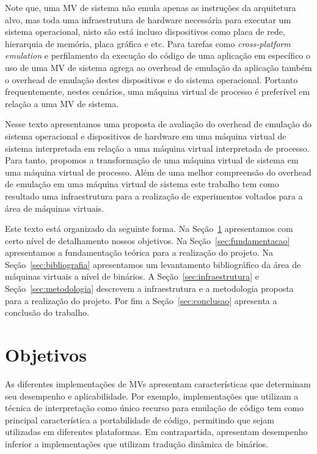 \documentclass[11pt,twoside]{article}
\begin{document}
Note que, uma MV de sistema não emula apenas as instruções da arquitetura alvo, mas toda uma infraestrutura de hardware
necessária para executar um sistema operacional, nisto são está incluso dispositivos como placa de rede, hierarquia de memória,
placa gráfica e etc. Para tarefas como \textit{cross-platform emulation} e perfilamento da execução do código de uma aplicação
em específico o uso de uma MV de sistema agrega ao overhead de emulação da aplicação também o overhead de emulação destes 
dispositivos e do sistema operacional. Portanto frequentemente, nestes cenários, uma máquina virtual de processo é preferível
em relação a uma MV de sistema.

Nesse texto apresentamos uma proposta de avaliação do overhead de emulação do sistema operacional e dispositivos de hardware
em uma máquina virtual de sistema interpretada em relação a uma máquina virtual interpretada de processo. Para tanto, propomos
a transformação de uma máquina virtual de sistema em uma máquina virtual de processo. Além de uma melhor compreensão do overhead
de emulação em uma máquina virtual de sistema este trabalho tem como resultado uma infraestrutura para a realização de experimentos
voltados para a área de máquinas virtuais. 

Este texto está organizado da seguinte forma. Na Seção~\ref{sec:objetivos} apresentamos com certo nível de detalhamento nossos objetivos. 
Na Seção~\ref{sec:fundamentacao} apresentamos a fundamentação teórica para a realização do projeto. Na Seção~\ref{sec:bibliografia} apresentamos
um levantamento bibliográfico da área de máquinas virtuais a nível de binários. A Seção~\ref{sec:infraestrutura} e Seção~\ref{sec:metodologia}
descrevem a infraestrutura e a metodologia proposta para a realização do projeto. Por fim a Seção~\ref{sec:conclusao} apresenta a conclusão do trabalho. 
  
  
  
  
\section{Objetivos} \label{sec:objetivos}
As diferentes implementações de MVs apresentam características que determinam seu desempenho e aplicabilidade.
Por exemplo, implementações que utilizam a técnica de interpretação como único recurso para emulação de código tem como principal característica a portabilidade de código, permitindo que sejam utilizadas em diferentes plataformas. 
Em contrapartida, apresentam desempenho inferior a implementações que utilizam tradução dinâmica de binários.
\end{document}
